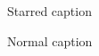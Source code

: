 \documentclass{article}
\begin{document}
\begin{figure}\caption*{Starred caption}\end{figure}
\begin{figure}\caption{Normal caption}\end{figure}
\end{document}
